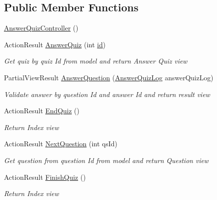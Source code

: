 \subsection*{Public Member Functions}
\begin{DoxyCompactItemize}
\item 
\hyperlink{class_website_1_1_controllers_1_1_answer_quiz_controller_aad0d017241caa1eb5129389174249367}{Answer\+Quiz\+Controller} ()
\item 
Action\+Result \hyperlink{class_website_1_1_controllers_1_1_answer_quiz_controller_a5d73ddc5b9cfda01b5c6f956f30cb16e}{Answer\+Quiz} (int \hyperlink{_facebook_8js_a9b3d01084d4285e8b0289ee3f959999b}{id})
\begin{DoxyCompactList}\small\item\em Get quiz by quiz Id from model and return Answer Quiz view \end{DoxyCompactList}\item 
Partial\+View\+Result \hyperlink{class_website_1_1_controllers_1_1_answer_quiz_controller_a0d9bc5eb87260a75ab6bf919b1dd14a0}{Answer\+Question} (\hyperlink{class_website_1_1_models_1_1_answer_quiz_log}{Answer\+Quiz\+Log} answer\+Quiz\+Log)
\begin{DoxyCompactList}\small\item\em Validate answer by question Id and answer Id and return result view \end{DoxyCompactList}\item 
Action\+Result \hyperlink{class_website_1_1_controllers_1_1_answer_quiz_controller_aa9872c01317d713d2876282b9e57f599}{End\+Quiz} ()
\begin{DoxyCompactList}\small\item\em Return Index view \end{DoxyCompactList}\item 
Action\+Result \hyperlink{class_website_1_1_controllers_1_1_answer_quiz_controller_aa66d506c0e30f9c265f02dcdb57fe3b9}{Next\+Question} (int qs\+Id)
\begin{DoxyCompactList}\small\item\em Get question from question Id from model and return Question view \end{DoxyCompactList}\item 
Action\+Result \hyperlink{class_website_1_1_controllers_1_1_answer_quiz_controller_a6d9032f7f907782bd8535f7890d1c6a6}{Finish\+Quiz} ()
\begin{DoxyCompactList}\small\item\em Return Index view \end{DoxyCompactList}\end{DoxyCompactItemize}
